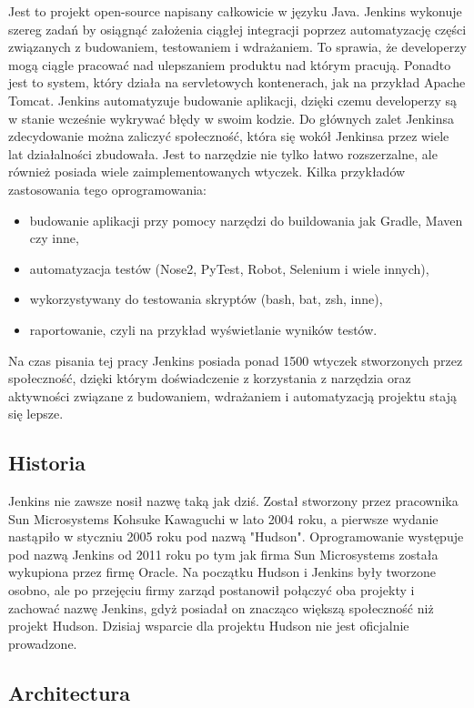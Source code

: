 Jest to projekt open-source napisany całkowicie w języku Java. Jenkins wykonuje szereg zadań by osiągnąć założenia ciągłej integracji poprzez automatyzację części związanych z budowaniem, testowaniem i wdrażaniem. To sprawia, że developerzy mogą ciągle pracować nad ulepszaniem produktu nad którym pracują. Ponadto jest to system, który działa na servletowych kontenerach, jak na przykład Apache Tomcat. 
Jenkins automatyzuje budowanie aplikacji, dzięki czemu developerzy są w stanie wcześnie wykrywać błędy w swoim kodzie. Do głównych zalet Jenkinsa zdecydowanie można zaliczyć społeczność, która się wokół Jenkinsa przez wiele lat działalności zbudowała. Jest to narzędzie nie tylko łatwo rozszerzalne, ale również posiada wiele zaimplementowanych wtyczek. 
Kilka przykładów zastosowania tego oprogramowania:
\begin{itemize}
    \item budowanie aplikacji przy pomocy narzędzi do buildowania jak Gradle, Maven czy inne, 
    \item automatyzacja testów  (Nose2, PyTest, Robot, Selenium i wiele innych),
    \item wykorzystywany do testowania skryptów (bash, bat, zsh, inne),
    \item raportowanie, czyli na przykład wyświetlanie wyników testów.
\end{itemize}

Na czas pisania tej pracy Jenkins posiada ponad 1500 wtyczek stworzonych przez społeczność, dzięki którym doświadczenie z korzystania z narzędzia oraz aktywności związane z budowaniem, wdrażaniem i automatyzacją projektu stają się lepsze. 

\subsection{Historia}

Jenkins nie zawsze nosił nazwę taką jak dziś. Został stworzony przez pracownika Sun Microsystems Kohsuke Kawaguchi w lato 2004 roku, a pierwsze wydanie nastąpiło w styczniu 2005 roku pod nazwą "Hudson". Oprogramowanie występuje pod nazwą Jenkins od 2011 roku po tym jak firma Sun Microsystems została wykupiona przez firmę Oracle. Na początku Hudson i Jenkins były tworzone osobno, ale po przejęciu firmy zarząd postanowił połączyć oba projekty i zachować nazwę Jenkins, gdyż posiadał on znacząco większą społeczność niż projekt Hudson. Dzisiaj wsparcie dla projektu Hudson nie jest oficjalnie prowadzone. 

\subsection{Architectura}

